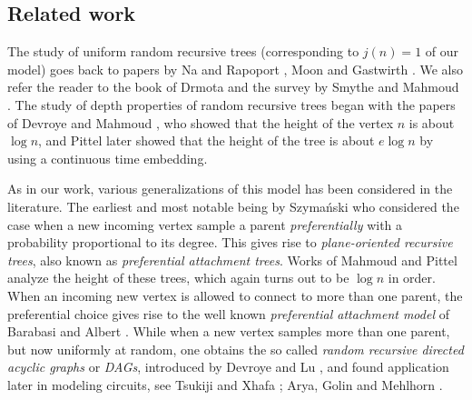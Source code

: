 \documentclass[letterpaper,11pt,reqno]{amsart}
\theoremstyle{definition}
\begin{document}
\subsection{Related work}
{The study of uniform random recursive trees (corresponding to $j(n)=1$ of our model) goes back to papers by Na and Rapoport \cite{na1970distribution}, Moon \cite{moon1974distance} and Gastwirth \cite{gastwirth1977probability}. We also refer the reader to the book of Drmota \cite{drmota2009random} and the survey by Smythe and Mahmoud \cite{smythe1995survey}. The study of depth properties of random recursive trees began with the papers of Devroye \cite{devroye1988applications} and Mahmoud \cite{mahmoud1991limiting}, who showed that the height of the vertex $n$ is about $\log n$, and Pittel \cite{pittel1994note} later showed that the height of the tree is about $e \log n$ by using a continuous time embedding.}

{As in our work, various generalizations of this model has been considered in the literature. The earliest and most notable being by Szymański \cite{szymanski1987nonuniform} who considered the case when a new incoming vertex sample a parent \emph{preferentially} with a probability proportional to its degree. This gives rise to \emph{plane-oriented recursive trees}, also known as \emph{preferential attachment trees}. Works of Mahmoud \cite{mahmoud1992distances} and Pittel \cite{pittel1994note} analyze the height of these trees, which again turns out to be $\log n$ in order. When an incoming new vertex is allowed to connect to more than one parent, the preferential choice gives rise to the well known \emph{preferential attachment model} of Barabasi and Albert \cite{barabasi1999emergence}. While when a new vertex samples more than one parent, but now uniformly at random, one obtains the so called \emph{random recursive directed acyclic graphs} or \emph{DAGs}, introduced by Devroye and Lu \cite{devroye1995strong}, and found application later in modeling circuits, see Tsukiji and Xhafa \cite{tsukiji1996depth}; Arya, Golin and Mehlhorn \cite{arya1999expected}.}
\end{document}
